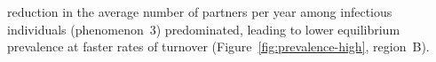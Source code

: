 reduction in the average number of partners per year among infectious individuals (phenomenon~3)
predominated, leading to lower equilibrium prevalence at faster rates of turnover
(Figure~\ref{fig:prevalence-high}, region~B).
